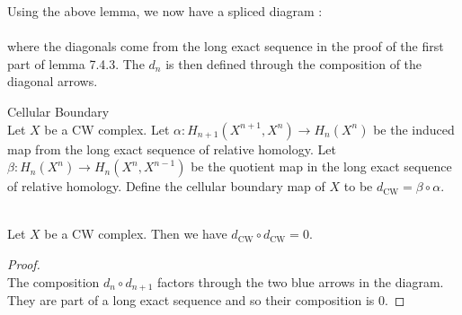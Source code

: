 \documentclass[a4paper]{article}
\begin{document}
Using the above lemma, we now have a spliced diagram : 
\\
\\
where the diagonals come from the long exact sequence in the proof of the first part of lemma 7.4.3. The $d_n$ is then defined through the composition of the diagonal arrows. 

\begin{defn}{Cellular Boundary}{}\\
Let $X$ be a CW complex. Let $\alpha:H_{n+1}(X^{n+1},X^n)\to H_n(X^n)$ be the induced map from the long exact sequence of relative homology. Let $\beta:H_n(X^n)\to H_n(X^n,X^{n-1})$ be the quotient map in the long exact sequence of relative homology. Define the cellular boundary map of $X$ to be $d_\text{CW}=\beta\circ\alpha$. 
\end{defn}

\begin{lmm}{}{}\\
Let $X$ be a CW complex. Then we have $d_\text{CW}\circ d_\text{CW}=0$. 
\begin{proof}\\
The composition $d_n\circ d_{n+1}$ factors through the two blue arrows in the diagram. They are part of a long exact sequence and so their composition is $0$. 
\end{proof}
\end{lmm}
\end{document}
